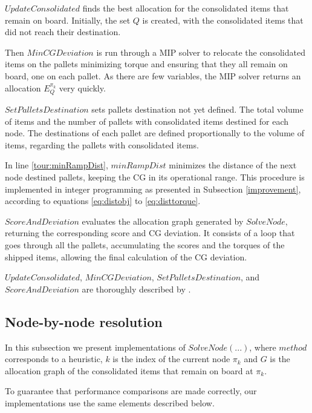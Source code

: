 \documentclass[preprint,authoryear]{elsarticle}
\begin{document}
$UpdateConsolidated$ finds the best allocation for the consolidated items that remain on board. Initially, the set $Q$ is created, with the consolidated items that did not reach their destination.

Then $MinCGDeviation$ is run through a MIP solver to relocate the consolidated items on the pallets minimizing torque and ensuring that they all remain on board, one on each pallet. As there are few variables, the MIP solver returns an allocation $E_Q^{\pi_k}$ very quickly.

$SetPalletsDestination$ sets pallets destination not yet defined. The total volume of items and the number of pallets with consolidated items destined for each node. The destinations of each pallet are defined proportionally to the volume of items, regarding the pallets with consolidated items.

In line \ref{tour:minRampDist}, $minRampDist$ minimizes the distance of the next node destined pallets, keeping the CG in its operational range. This procedure is implemented in integer programming as presented in Subsection \ref{improvement}, according to equations \ref{eq:distobj} to \ref{eq:disttorque}.

$ScoreAndDeviation$ evaluates the allocation graph generated by $SolveNode$, returning the corresponding score and CG deviation. It consists of a loop that goes through all the pallets, accumulating the scores and the torques of the shipped items, allowing the final calculation of the CG deviation.

$UpdateConsolidated$, $MinCGDeviation$, $SetPalletsDestination$, and $ScoreAndDeviation$ are thoroughly described by \cite{MesquitaSanches2023}.


\subsection{Node-by-node resolution}
\label{methods}


In this subsection we present implementations of $SolveNode(...)$, where $method$\/ corresponds to a heuristic, $k$\/ is the index of the current node $\pi_k$ and $G$\/ is the allocation graph of the consolidated items that remain on board at $\pi_k$.

To guarantee that performance comparisons are made correctly, our implementations use the same elements described below.

\end{document}
